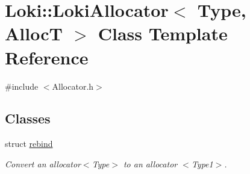 \hypertarget{classLoki_1_1LokiAllocator}{}\section{Loki\+:\+:Loki\+Allocator$<$ Type, Alloc\+T $>$ Class Template Reference}
\label{classLoki_1_1LokiAllocator}


{\ttfamily \#include $<$Allocator.\+h$>$}

\subsection*{Classes}
\begin{DoxyCompactItemize}
\item 
struct \hyperlink{structLoki_1_1LokiAllocator_1_1rebind}{rebind}
\begin{DoxyCompactList}\small\item\em Convert an allocator$<$\+Type$>$ to an allocator $<$\+Type1$>$. \end{DoxyCompactList}\end{DoxyCompactItemize}
